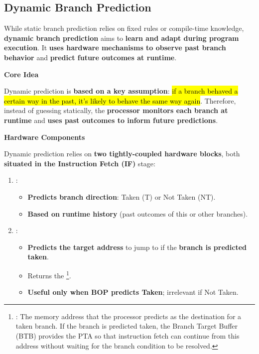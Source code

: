 \subsection{Dynamic Branch Prediction}

While static branch prediction relies on fixed rules or compile-time knowledge, \textbf{dynamic branch prediction} aims to \textbf{learn and adapt during program execution}. It \textbf{uses hardware mechanisms to observe past branch behavior} and \textbf{predict future outcomes at runtime}.

\highspace
\begin{flushleft}
    \textcolor{Green3}{ \textbf{Core Idea}}
\end{flushleft}
Dynamic prediction is \textbf{based on a key assumption}: \hl{if a branch behaved a certain way in the past, it's likely to behave the same way again}. Therefore, instead of guessing statically, the \textbf{processor monitors each branch at runtime} and \textbf{uses past outcomes to inform future predictions}.

\highspace
\begin{flushleft}
    \textcolor{Green3}{ \textbf{Hardware Components}}
\end{flushleft}
Dynamic prediction relies on \textbf{two tightly-coupled hardware blocks}, both \textbf{situated in the Instruction Fetch (IF)} stage:
\begin{enumerate}
    \item {}:
    \begin{itemize}
        \item \textbf{Predicts branch direction}: Taken (T) or Not Taken (NT).
        \item \textbf{Based on runtime history} (past outcomes of this or other branches).
    \end{itemize}
    \item {}:
    \begin{itemize}
        \item \textbf{Predicts the target address} to jump to if the \textbf{branch is predicted taken}.
        \item Returns the \footnote{%
            : The memory address that the processor predicts as the destination for a taken branch. If the branch is predicted taken, the Branch Target Buffer (BTB) provides the PTA so that instruction fetch can continue from this address without waiting for the branch condition to be resolved.
        }.
        \item \textbf{Useful only when BOP predicts Taken}; irrelevant if Not Taken.
    \end{itemize}
\end{enumerate}

